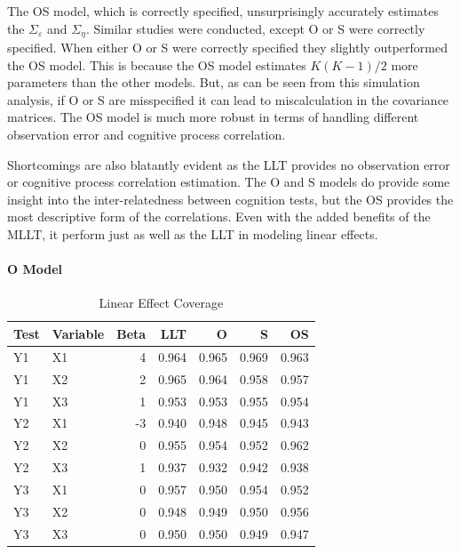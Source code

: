 \documentclass[
]{article}
\begin{document}
The OS model, which is correctly specified, unsurprisingly accurately estimates the \(\Sigma_\varepsilon\) and \(\Sigma_\eta\). Similar studies were conducted, except O or S were correctly specified. When either O or S were correctly specified they slightly outperformed the OS model. This is because the OS model estimates \(K(K-1)/2\) more parameters than the other models. But, as can be seen from this simulation analysis, if O or S are misspecified it can lead to miscalculation in the covariance matrices. The OS model is much more robust in terms of handling different observation error and cognitive process correlation.

Shortcomings are also blatantly evident as the LLT provides no observation error or cognitive process correlation estimation. The O and S models do provide some insight into the inter-relatedness between cognition tests, but the OS provides the most descriptive form of the correlations. Even with the added benefits of the MLLT, it perform just as well as the LLT in modeling linear effects.

\hypertarget{o-model-1}{%
\paragraph{O Model}\label{o-model-1}}

\begin{longtable}[t]{l|l|r|r|r|r|r}
\caption{\label{tab:unnamed-chunk-8}Linear Effect Coverage}\\
\hline
Test & Variable & Beta & LLT & O & S & OS\\
\hline
Y1 & X1 & 4 & 0.964 & 0.965 & 0.969 & 0.963\\
\hline
Y1 & X2 & 2 & 0.965 & 0.964 & 0.958 & 0.957\\
\hline
Y1 & X3 & 1 & 0.953 & 0.953 & 0.955 & 0.954\\
\hline
Y2 & X1 & -3 & 0.940 & 0.948 & 0.945 & 0.943\\
\hline
Y2 & X2 & 0 & 0.955 & 0.954 & 0.952 & 0.962\\
\hline
Y2 & X3 & 1 & 0.937 & 0.932 & 0.942 & 0.938\\
\hline
Y3 & X1 & 0 & 0.957 & 0.950 & 0.954 & 0.952\\
\hline
Y3 & X2 & 0 & 0.948 & 0.949 & 0.950 & 0.956\\
\hline
Y3 & X3 & 0 & 0.950 & 0.950 & 0.949 & 0.947\\
\hline
\end{longtable}
\end{document}
